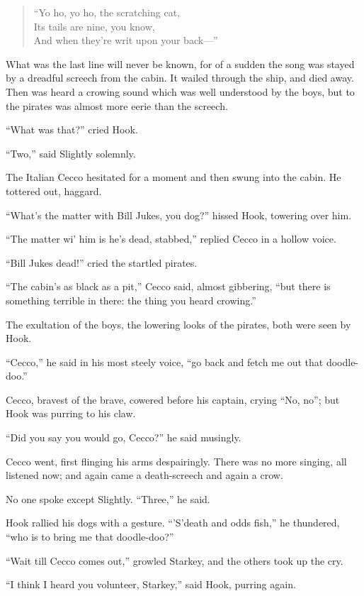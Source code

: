 \begin{verse}
	“Yo ho, yo ho, the scratching cat,\\
	Its tails are nine, you know,\\
	And when they’re writ upon your back—”
\end{verse}

What was the last line will never be known,
for of a sudden the song was stayed by a dreadful screech from the cabin.
It wailed through the ship, and died away.
Then was heard a crowing sound which was well understood by the boys,
but to the pirates was almost more eerie than the screech.

“What was that?\@” cried Hook.

“Two,” said Slightly solemnly.

The Italian Cecco hesitated for a moment and then swung into the cabin.
He tottered out, haggard.

“What’s the matter with Bill Jukes, you dog?\@” hissed Hook, towering over him.

“The matter wi’ him is he’s dead, stabbed,” replied Cecco in a hollow voice.

“Bill Jukes dead!\@” cried the startled pirates.

“The cabin’s as black as a pit,” Cecco said, almost gibbering,
“but there is something terrible in there:
the thing you heard crowing.”

The exultation of the boys, the lowering looks of the pirates, both were seen by Hook.

“Cecco,” he said in his most steely voice,
“go back and fetch me out that doodle-doo.”

Cecco, bravest of the brave, cowered before his captain, crying “No, no”;
but Hook was purring to his claw.

“Did you say you would go, Cecco?\@” he said musingly.

Cecco went, first flinging his arms despairingly.
There was no more singing, all listened now;
and again came a death-screech and again a crow.

No one spoke except Slightly.
“Three,” he said.

Hook rallied his dogs with a gesture.
“’S’death and odds fish,” he thundered,
“who is to bring me that doodle-doo?”

“Wait till Cecco comes out,” growled Starkey,
and the others took up the cry.

“I think I heard you volunteer, Starkey,” said Hook, purring again.

